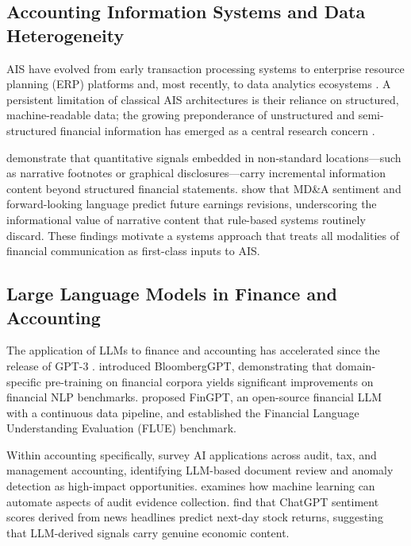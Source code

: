 \documentclass[12pt,letterpaper]{article}
\begin{document}
\subsection{Accounting Information Systems and Data Heterogeneity}

AIS have evolved from early transaction processing systems to enterprise
resource planning (ERP) platforms and, most recently, to data analytics
ecosystems \citep{mauldin2000}.
A persistent limitation of classical AIS architectures is their reliance
on structured, machine-readable data; the growing preponderance of
unstructured and semi-structured financial information has emerged as a
central research concern \citep{dechow2011}.

\citet{hoitash2018} demonstrate that quantitative signals embedded in
non-standard locations---such as narrative footnotes or graphical
disclosures---carry incremental information content beyond structured
financial statements.
\citet{brown2015} show that MD\&A sentiment and forward-looking language
predict future earnings revisions, underscoring the informational value
of narrative content that rule-based systems routinely discard.
These findings motivate a systems approach that treats all modalities of
financial communication as first-class inputs to AIS.

\subsection{Large Language Models in Finance and Accounting}

The application of LLMs to finance and accounting has accelerated since
the release of GPT-3 \citep{brown2020}.
\citet{wu2023} introduced BloombergGPT, demonstrating that domain-specific
pre-training on financial corpora yields significant improvements on
financial NLP benchmarks.
\citet{yang2023} proposed FinGPT, an open-source financial LLM with a
continuous data pipeline, and \citet{shah2022} established the Financial
Language Understanding Evaluation (FLUE) benchmark.

Within accounting specifically, \citet{cao2023} survey AI applications
across audit, tax, and management accounting, identifying LLM-based
document review and anomaly detection as high-impact opportunities.
\citet{sun2019} examines how machine learning can automate aspects of
audit evidence collection.
\citet{lopezlira2023} find that ChatGPT sentiment scores derived from
news headlines predict next-day stock returns, suggesting that
LLM-derived signals carry genuine economic content.
\end{document}
